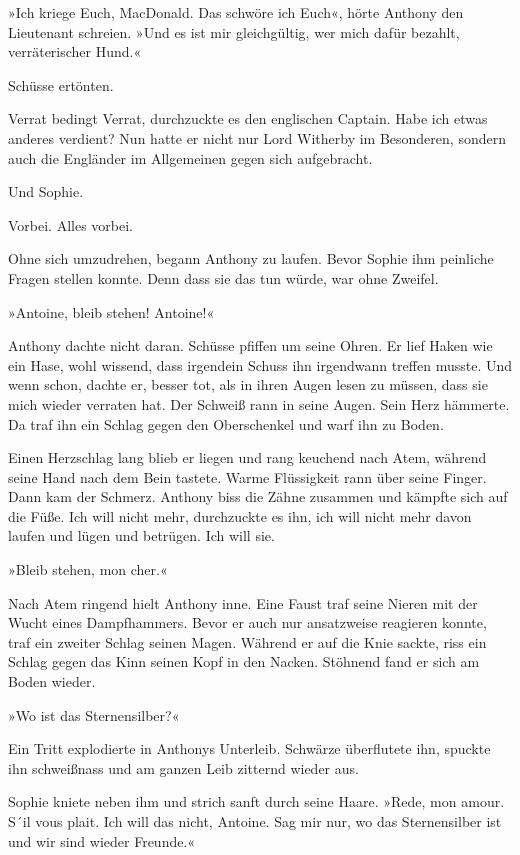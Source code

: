 »Ich kriege Euch, MacDonald. Das schwöre ich Euch«, hörte Anthony
den Lieutenant schreien. »Und es ist mir gleichgültig, wer mich
dafür bezahlt, verräterischer Hund.«

Schüsse ertönten.

Verrat bedingt Verrat, durchzuckte es den englischen Captain. Habe
ich etwas anderes verdient? Nun hatte er nicht nur Lord Witherby im
Besonderen, sondern auch die Engländer im Allgemeinen gegen sich
aufgebracht.

Und Sophie.

Vorbei. Alles vorbei.

Ohne sich umzudrehen, begann Anthony zu laufen. Bevor Sophie ihm
peinliche Fragen stellen konnte. Denn dass sie das tun würde, war
ohne Zweifel.

»Antoine, bleib stehen! Antoine!«

Anthony dachte nicht daran. Schüsse pfiffen um seine Ohren. Er lief
Haken wie ein Hase, wohl wissend, dass irgendein Schuss ihn
irgendwann treffen musste. Und wenn schon, dachte er, besser tot,
als in ihren Augen lesen zu müssen, dass sie mich wieder verraten
hat. Der Schweiß rann in seine Augen. Sein Herz hämmerte. Da traf
ihn ein Schlag gegen den Oberschenkel und warf ihn zu Boden.

Einen Herzschlag lang blieb er liegen und rang keuchend nach Atem,
während seine Hand nach dem Bein tastete. Warme Flüssigkeit rann
über seine Finger. Dann kam der Schmerz. Anthony biss die Zähne
zusammen und kämpfte sich auf die Füße. Ich will nicht mehr,
durchzuckte es ihn, ich will nicht mehr davon laufen und lügen und
betrügen. Ich will sie.

»Bleib stehen, mon cher.«

Nach Atem ringend hielt Anthony inne. Eine Faust traf seine Nieren
mit der Wucht eines Dampfhammers. Bevor er auch nur ansatzweise
reagieren konnte, traf ein zweiter Schlag seinen Magen. Während er
auf die Knie sackte, riss ein Schlag gegen das Kinn seinen Kopf in
den Nacken. Stöhnend fand er sich am Boden wieder.

»Wo ist das Sternensilber?«

Ein Tritt explodierte in Anthonys Unterleib. Schwärze überflutete
ihn, spuckte ihn schweißnass und am ganzen Leib zitternd wieder
aus.

Sophie kniete neben ihm und strich sanft durch seine Haare. »Rede,
mon amour. S´il vous plait. Ich will das nicht, Antoine. Sag mir
nur, wo das Sternensilber ist und wir sind wieder Freunde.«

